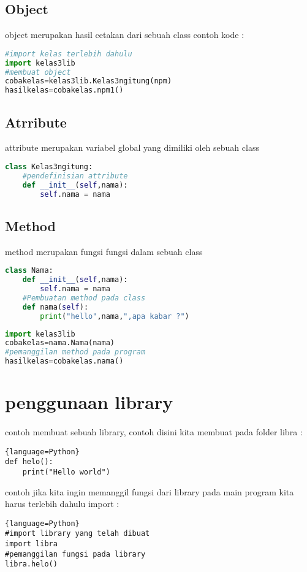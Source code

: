 \documentclass[a4paper,12pt]{report}
\begin{document}
\subsection*{Object}
object merupakan hasil cetakan dari sebuah class
contoh kode :
\begin{lstlisting}[language=Python]
#import kelas terlebih dahulu
import kelas3lib
#membuat object
cobakelas=kelas3lib.Kelas3ngitung(npm) 
hasilkelas=cobakelas.npm1()
\end{lstlisting}
\subsection*{Atrribute}
attribute merupakan variabel global yang dimiliki oleh sebuah class
\begin{lstlisting}[language=Python]
class Kelas3ngitung:
	#pendefinisian attribute
    def __init__(self,nama):
        self.nama = nama
\end{lstlisting}
\subsection*{Method}
method merupakan fungsi fungsi dalam sebuah class
\begin{lstlisting}[language=Python]
class Nama:
    def __init__(self,nama):
        self.nama = nama
    #Pembuatan method pada class
    def nama(self):
       	print("hello",nama,",apa kabar ?")
\end{lstlisting}

\begin{lstlisting}[language=Python]
import kelas3lib
cobakelas=nama.Nama(nama) 
#pemanggilan method pada program
hasilkelas=cobakelas.nama()
\end{lstlisting}
\section{penggunaan library}
\paragraph{}
contoh membuat sebuah library, contoh disini kita membuat pada folder libra :
\begin{lstlisting}{language=Python}
def helo():
    print("Hello world")
\end{lstlisting}

contoh jika kita ingin memanggil fungsi dari library pada main program kita harus terlebih dahulu import :
\begin{lstlisting}{language=Python}
#import library yang telah dibuat
import libra
#pemanggilan fungsi pada library
libra.helo()
\end{lstlisting}
\end{document}
